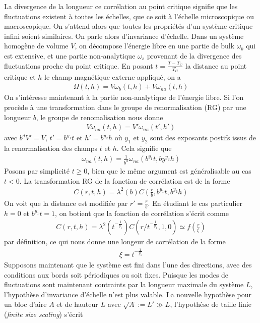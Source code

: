 La divergence de la longueur ce corrélation au point critique signifie que les fluctuations existent à toutes les échelles, que ce soit à l'échelle microscopique ou macroscopique. On s'attend alors que toutes les propriétés d'un système critique infini soient similaires. On parle alors d'invariance d'échelle. Dans un système homogène de volume $V$, on décompose l'énergie libre en une partie de bulk $\omega_b$ qui est extensive, et une partie non-analytique $\omega_s$ provenant de la divergence des fluctuations proche du point critique. En posant $t=\frac{T-T_C}{T_C}$ la distance au point critique et $h$ le champ magnétique externe appliqué, on a
\begin{align}
    \Omega(t,h) = V \omega_b(t,h) + V \omega_{na}(t,h)
    \label{decomposition-free-energie}
\end{align}
On s'intéresse maintenant à la partie non-analytique de l'énergie libre. Si l'on procède à une transformation dans le groupe de renormalisation (RG) \cite{amit_field_2005} par une longueur $b$, le groupe de renomalisation nous donne
\begin{align}
    V \omega_{na}(t,h) = V' \omega_{na}(t',h')
\end{align}
avec $b^d V' = V$, $t'=b^{y_1}t$ et $h'=b^{y_2}h$ où $y_1$ et $y_2$ sont des exposants postifs issus de la renormalisation des champs $t$ et $h$. Cela signifie que
\begin{align}
    \omega_{na}(t,h) = \frac{1}{b^d} \omega_{na}(b^{y_1}t, by^{y_2}h)
\end{align}
Posons par simplicité $t \ge 0$, bien que le même argument est généralisable au cas $t \less 0$. La transformation RG de la fonction de corrélation est de la forme
\begin{align}
    C(r,t,h) = \lambda^2(b) C(\frac{r}{b},b^{y_1}t,b^{y_2}h)
\end{align}
On voit que la distance est modifiée par $r' = \frac{r}{b}$. En étudiant le cas particulier $h=0$ et $b^{y_1}t = 1$, on botient que la fonction de corrélation s'écrit comme
\begin{align}
    C(r,t,h) = \lambda^2(t^{-\frac{1}{y_1}}) C(r/t^{-\frac{1}{y_1}},1,0) \simeq f(\frac{r}{\xi})
\end{align}
par définition, ce qui nous donne une longeur de corrélation de la forme 
\begin{align}
    \xi = t^{-\frac{1}{y_1}}
\end{align}
Supposons maintenant que le système est fini dans l'une des directions,  avec des conditions aux bords soit périodiques ou soit fixes. Puisque les modes de fluctuations sont maintenant contraints par la longueur maximale du système $L$, l'hypothèse d'invariance d'échelle n'est plus valable. La nouvelle hypothèse pour un bloc d'aire $A$ et de hauteur $L$ avec $\sqrt{A} := L' \gg L$, l'hypothèse de taille finie (\textit{finite size scaling}) s'écrit 
